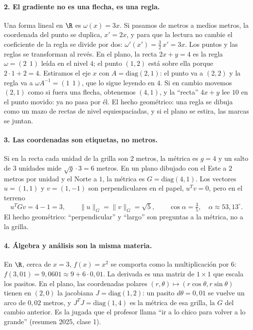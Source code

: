 \paragraph{2. El gradiente no es una flecha, es una regla.}
Una forma lineal en \(\R\) es \(\omega(x)=3x\). Si pasamos de metros a medios metros, la
coordenada del punto se duplica, \(x'=2x\), y para que la lectura no cambie el coeficiente
de la regla se divide por dos: \(\omega'(x')=\tfrac32\,x'=3x\). Los puntos y las reglas se
transforman al revés. En el plano, la recta \(2x+y=4\) es la regla \(\omega=(2\ \ 1)\)
leída en el nivel \(4\); el punto \((1,2)\) está sobre ella porque \(2\cdot1+2=4\).
Estiramos el eje \(x\) con \(A=\mathrm{diag}(2,1)\): el punto va a \((2,2)\) y la regla va a
\(\omega A^{-1}=(1\ \ 1)\), que lo sigue leyendo en \(4\). Si en cambio movemos \((2,1)\)
como si fuera una flecha, obtenemos \((4,1)\), y la ``recta'' \(4x+y\) lee \(10\) en el
punto movido: ya no pasa por él. El hecho geométrico: una regla se dibuja como un mazo de
rectas de nivel equiespaciadas, y si el plano se estira, las marcas se juntan.

\paragraph{3. Las coordenadas son etiquetas, no metros.}
Si en la recta cada unidad de la grilla son \(2\) metros, la métrica es \(g=4\) y un salto
de \(3\) unidades mide \(\sqrt{g}\cdot3=6\) metros. En un plano dibujado con el Este a
\(2\) metros por unidad y el Norte a \(1\), la métrica es \(G=\mathrm{diag}(4,1)\). Los
vectores \(u=(1,1)\) y \(v=(1,-1)\) son perpendiculares en el papel, \(u^Tv=0\), pero en el
terreno
\[
  u^TGv=4-1=3,\qquad \|u\|_G=\|v\|_G=\sqrt5,\qquad \cos\alpha=\tfrac35,\quad
  \alpha\approx53{,}13^\circ .
\]
El hecho geométrico: ``perpendicular'' y ``largo'' son preguntas a la métrica, no a la
grilla.

\paragraph{4. Álgebra y análisis son la misma materia.}
En \(\R\), cerca de \(x=3\), \(f(x)=x^2\) se comporta como la multiplicación por \(6\):
\(f(3{,}01)=9{,}0601\approx9+6\cdot0{,}01\). La derivada es una matriz de \(1\times1\) que
escala los pasitos. En el plano, las coordenadas polares \((r,\theta)\mapsto(r\cos\theta,
r\sin\theta)\) tienen en \((2,0)\) la jacobiana \(J=\mathrm{diag}(1,2)\): un pasito
\(d\theta=0{,}01\) se vuelve un arco de \(0{,}02\) metros, y \(J^TJ=\mathrm{diag}(1,4)\) es
la métrica de esa grilla, la \(G\) del cambio anterior. Es la jugada que el profesor llama
``ir a lo chico para volver a lo grande'' (resumen 2025, clase 1).

